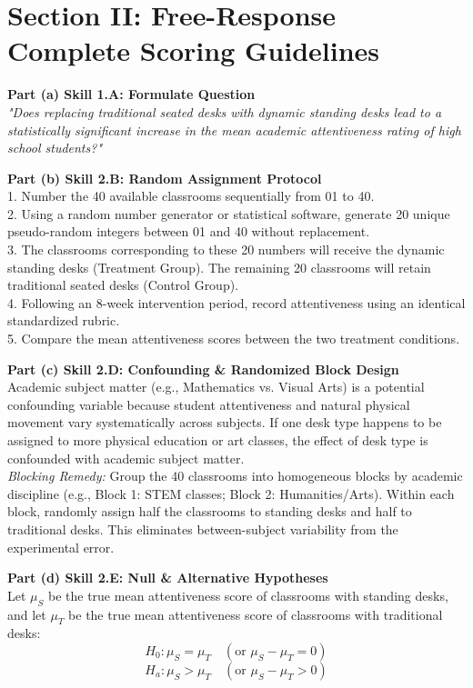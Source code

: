 \section{Section II: Free-Response Complete Scoring Guidelines}

\begin{frqrubricbox}
\textbf{Part (a) Skill 1.A: Formulate Question}\\
\textit{"Does replacing traditional seated desks with dynamic standing desks lead to a statistically significant increase in the mean academic attentiveness rating of high school students?"}

\textbf{Part (b) Skill 2.B: Random Assignment Protocol}\\
1. Number the 40 available classrooms sequentially from 01 to 40.\\
2. Using a random number generator or statistical software, generate 20 unique pseudo-random integers between 01 and 40 without replacement.\\
3. The classrooms corresponding to these 20 numbers will receive the dynamic standing desks (Treatment Group). The remaining 20 classrooms will retain traditional seated desks (Control Group).\\
4. Following an 8-week intervention period, record attentiveness using an identical standardized rubric.\\
5. Compare the mean attentiveness scores between the two treatment conditions.

\textbf{Part (c) Skill 2.D: Confounding \& Randomized Block Design}\\
Academic subject matter (e.g., Mathematics vs. Visual Arts) is a potential confounding variable because student attentiveness and natural physical movement vary systematically across subjects. If one desk type happens to be assigned to more physical education or art classes, the effect of desk type is confounded with academic subject matter.\\
\textit{Blocking Remedy:} Group the 40 classrooms into homogeneous blocks by academic discipline (e.g., Block 1: STEM classes; Block 2: Humanities/Arts). Within each block, randomly assign half the classrooms to standing desks and half to traditional desks. This eliminates between-subject variability from the experimental error.

\textbf{Part (d) Skill 2.E: Null \& Alternative Hypotheses}\\
Let $\mu_S$ be the true mean attentiveness score of classrooms with standing desks, and let $\mu_T$ be the true mean attentiveness score of classrooms with traditional desks:
\[ H_0: \mu_S = \mu_T \quad (\text{or } \mu_S - \mu_T = 0) \]
\[ H_a: \mu_S > \mu_T \quad (\text{or } \mu_S - \mu_T > 0) \]


\end{frqrubricbox}
